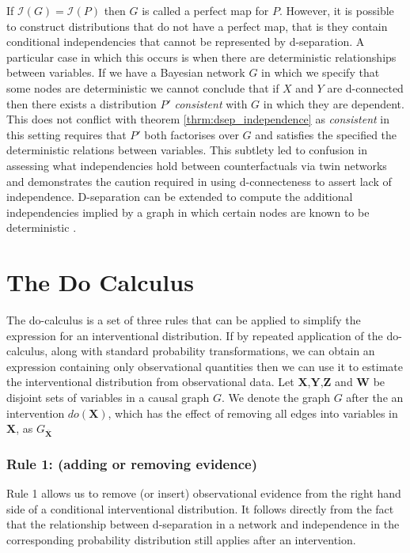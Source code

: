 \documentclass[11pt,a4paper,oneside]{book}
\newcommand{\indep}[1]{\mathcal{I}\left(#1\right)}
\theoremstyle{plain}
\theoremstyle{definition}
\begin{document}
If $\indep{G} = \indep{P}$ then $G$ is called a perfect map for $P$. However, it is possible to construct distributions that do not have a perfect map, that is they contain conditional independencies that cannot be represented by d-separation. A particular case in which this occurs is when there are deterministic relationships between variables. If we have a Bayesian network $G$ in which we specify that some nodes are deterministic we cannot conclude that if $X$ and $Y$ are d-connected then there exists a distribution $P'$ \emph{consistent} with $G$ in which they are dependent. This does not conflict with theorem \ref{thrm:dsep_independence} as \emph{consistent} in this setting requires that $P'$ both factorises over $G$ and satisfies the specified the deterministic relations between variables. This subtlety led to confusion in assessing what independencies hold between counterfactuals via twin networks \citep{Pearl2000,Richardson2013} and demonstrates the caution required in using d-connecteness to assert lack of independence. D-separation can be extended to compute the additional independencies implied by a graph in which certain nodes are known to be deterministic \citep{Geiger1990}. 

\section{The Do Calculus} 
\label{sec:do_calculus}

The do-calculus is a set of three rules \citep{Pearl1995} that can be applied to simplify the expression for an interventional distribution. If by repeated application of the do-calculus, along with standard probability transformations, we can obtain an expression containing only observational quantities then we can use it to estimate the interventional distribution from observational data. Let $\boldsymbol{X}$,$\boldsymbol{Y}$,$\boldsymbol{Z}$ and $\boldsymbol{W}$ be disjoint sets of variables in a causal graph $G$. We denote the graph $G$ after the an intervention $do(\boldsymbol{X})$, which has the effect of removing all edges into variables in $\boldsymbol{X}$, as $G_{\overline{\boldsymbol{X}}}$

\subsubsection{Rule 1: (adding or removing evidence)} 

Rule 1 allows us to remove (or insert) observational evidence from the right hand side of a conditional interventional distribution. It follows directly from the fact that the relationship between d-separation in a network and independence in the corresponding probability distribution still applies after an intervention. 
\end{document}
